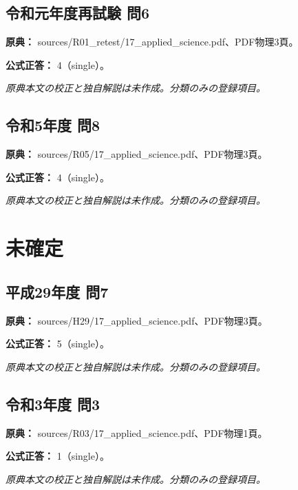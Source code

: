 \subsection{令和元年度再試験 問6}
\label{q:r01-ret-applied-06}

\noindent\textbf{原典：} sources/R01\_retest/17\_applied\_science.pdf、PDF物理3頁。

\textbf{公式正答：} 4（single）。

\par\textit{原典本文の校正と独自解説は未作成。分類のみの登録項目。}

\subsection{令和5年度 問8}
\label{q:r05-reg-applied-08}

\noindent\textbf{原典：} sources/R05/17\_applied\_science.pdf、PDF物理3頁。

\textbf{公式正答：} 4（single）。

\par\textit{原典本文の校正と独自解説は未作成。分類のみの登録項目。}

\section{未確定}

\subsection{平成29年度 問7}
\label{q:h29-reg-applied-07}

\noindent\textbf{原典：} sources/H29/17\_applied\_science.pdf、PDF物理3頁。

\textbf{公式正答：} 5（single）。

\par\textit{原典本文の校正と独自解説は未作成。分類のみの登録項目。}

\subsection{令和3年度 問3}
\label{q:r03-reg-applied-03}

\noindent\textbf{原典：} sources/R03/17\_applied\_science.pdf、PDF物理1頁。

\textbf{公式正答：} 1（single）。

\par\textit{原典本文の校正と独自解説は未作成。分類のみの登録項目。}

